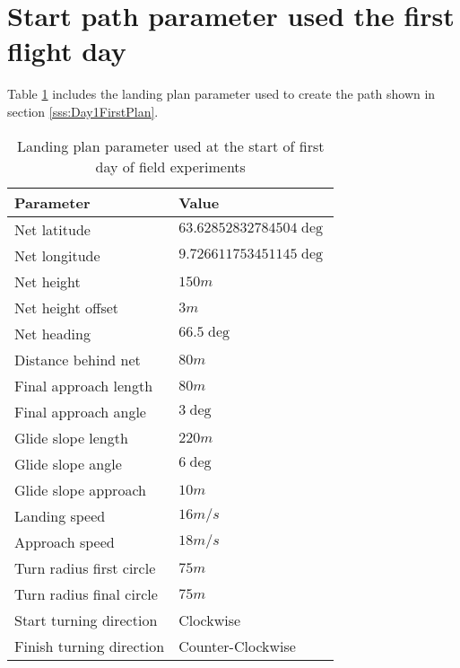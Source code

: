\section{Start path parameter used the first flight day}\label{AP:SpecDay1}
Table \ref{AP:TB:landingDay1} includes the landing plan parameter used to create the path shown in section \ref{sss:Day1FirstPlan}.
\begin{table}[H]
\centering
\begin{tabular}{| p{4cm} | p{4cm} |}
\hline
\textbf{Parameter}			& \textbf{Value}			\\ \hline
Net latitude				& $63.62852832784504 \deg$ 	\\ \hline
Net longitude				& $9.726611753451145 \deg$ 	\\ \hline
Net height					& $150 m$					\\ \hline
Net height offset			& $3 m$ 	\\ \hline
Net heading					& $66.5 \deg$				\\ \hline
Distance behind net			& $80 m$					\\ \hline
Final approach length		& $80 m$					\\ \hline
Final approach angle		& $3 \deg$					\\ \hline
Glide slope length			& $220 m $					\\ \hline
Glide slope angle			& $6 \deg$					\\ \hline
Glide slope approach		& $10 m$					\\ \hline
Landing speed				& $16 m/s$					\\ \hline
Approach speed				& $18 m/s$					\\ \hline
Turn radius first circle	& $75 m$					\\ \hline
Turn radius final circle	& $75 m$					\\ \hline
Start turning direction		& Clockwise					\\ \hline
Finish turning direction	& Counter-Clockwise			\\ \hline
\end{tabular}
\caption{Landing plan parameter used at the start of first day of field experiments}
\label{AP:TB:landingDay1}
\end{table}
